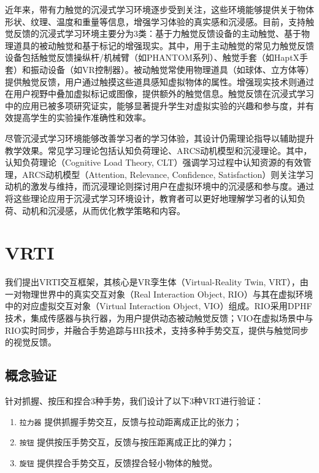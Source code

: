 \documentclass[runningheads]{llncs}
\begin{document}
近年来，带有力触觉的沉浸式学习环境逐步受到关注\cite{10.1145/3593429,shen2023research,johnson2023embodied}，这些环境能够提供关于物体形状、纹理、温度和重量等信息，增强学习体验的真实感和沉浸感\cite{varela2017embodied}。目前，支持触觉反馈的沉浸式学习环境主要分为3类：基于力触觉反馈设备的主动触觉\cite{qi2020impact,acevedo2022effects}、基于物理道具的被动触觉\cite{10.1145/3593429}和基于标记的增强现实\cite{knierim2020tangibility,liu2021effects}。其中，用于主动触觉的常见力触觉反馈设备包括触觉反馈操纵杆/机械臂（如PHANTOM系列）、触觉手套（如HaptX手套）和振动设备（如VR控制器）。被动触觉常使用物理道具（如球体、立方体等）提供触觉反馈，用户通过触摸这些道具感知虚拟物体的属性。增强现实技术则通过在用户视野中叠加虚拟标记或图像，提供额外的触觉信息。触觉反馈在沉浸式学习中的应用已被多项研究证实，能够显著提升学生对虚拟实验的兴趣和参与度\cite{qi2020impact}，并有效提高学生的实验操作准确性和效率\cite{acevedo2022effects}。

尽管沉浸式学习环境能够改善学习者的学习体验，其设计仍需理论指导以辅助提升教学效果\cite{matovu2023immersive,marougkas2023virtual}。常见学习理论包括认知负荷理论\cite{sweller1988cognitive}、ARCS动机模型\cite{keller1987development}和沉浸理论\cite{sherman2003understanding}。其中，认知负荷理论（Cognitive Load Theory, CLT）强调学习过程中认知资源的有效管理，ARCS动机模型（Attention, Relevance, Confidence, Satisfaction）则关注学习动机的激发与维持，而沉浸理论则探讨用户在虚拟环境中的沉浸感和参与度。通过将这些理论应用于沉浸式学习环境设计，教育者可以更好地理解学习者的认知负荷、动机和沉浸感，从而优化教学策略和内容。

\section{VRTI}
我们提出VRTI交互框架，其核心是VR孪生体（Virtual-Reality Twin, VRT），由一对物理世界中的真实交互对象（Real Interaction Object, RIO）与其在虚拟环境中的对应虚拟交互对象（Virtual Interaction Object, VIO）组成。RIO采用DPHF技术，集成传感器与执行器，为用户提供动态被动触觉反馈；VIO在虚拟场景中与RIO实时同步，并融合手势追踪与HR技术，支持多种手势交互，提供与触觉同步的视觉反馈。

\subsection{概念验证}
针对抓握、按压和捏合3种手势，我们设计了以下3种VRT进行验证：

\begin{enumerate}[label={\arabic*)}]
  \item \texttt{拉力器} 提供抓握手势交互，反馈与拉动距离成正比的张力；
  \item \texttt{按钮} 提供按压手势交互，反馈与按压距离成正比的弹力；
  \item \texttt{旋钮} 提供捏合手势交互，反馈捏合轻小物体的触觉。
\end{enumerate}
\end{document}
